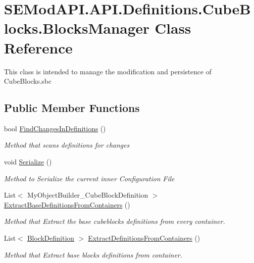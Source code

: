\hypertarget{class_s_e_mod_a_p_i_1_1_a_p_i_1_1_definitions_1_1_cube_blocks_1_1_blocks_manager}{}\section{S\+E\+Mod\+A\+P\+I.\+A\+P\+I.\+Definitions.\+Cube\+Blocks.\+Blocks\+Manager Class Reference}
\label{class_s_e_mod_a_p_i_1_1_a_p_i_1_1_definitions_1_1_cube_blocks_1_1_blocks_manager}


This class is intended to manage the modification and persistence of Cube\+Blocks.\+sbc  


\subsection*{Public Member Functions}
\begin{DoxyCompactItemize}
\item 
bool \hyperlink{class_s_e_mod_a_p_i_1_1_a_p_i_1_1_definitions_1_1_cube_blocks_1_1_blocks_manager_a31c95c16cef167ad5e8691a30e563763}{Find\+Changes\+In\+Definitions} ()
\begin{DoxyCompactList}\small\item\em Method that scans definitions for changes \end{DoxyCompactList}\item 
void \hyperlink{class_s_e_mod_a_p_i_1_1_a_p_i_1_1_definitions_1_1_cube_blocks_1_1_blocks_manager_ab57ffe7ba4a0b3d8a86803b45c6338ac}{Serialize} ()
\begin{DoxyCompactList}\small\item\em Method to Serialize the current inner Configuration File \end{DoxyCompactList}\item 
List$<$ My\+Object\+Builder\+\_\+\+Cube\+Block\+Definition $>$ \hyperlink{class_s_e_mod_a_p_i_1_1_a_p_i_1_1_definitions_1_1_cube_blocks_1_1_blocks_manager_aee618fda8401a1a8285a6de1100e9d11}{Extract\+Base\+Definitions\+From\+Containers} ()
\begin{DoxyCompactList}\small\item\em Method that Extract the base cubeblocks definitions from every container. \end{DoxyCompactList}\item 
List$<$ \hyperlink{class_s_e_mod_a_p_i_1_1_a_p_i_1_1_definitions_1_1_cube_blocks_1_1_block_definition}{Block\+Definition} $>$ \hyperlink{class_s_e_mod_a_p_i_1_1_a_p_i_1_1_definitions_1_1_cube_blocks_1_1_blocks_manager_ab2fbac4df0d51c0b510655fab9ca6206}{Extract\+Definitions\+From\+Containers} ()
\begin{DoxyCompactList}\small\item\em Method that Extract base blocks definitions from container. \end{DoxyCompactList}\end{DoxyCompactItemize}
